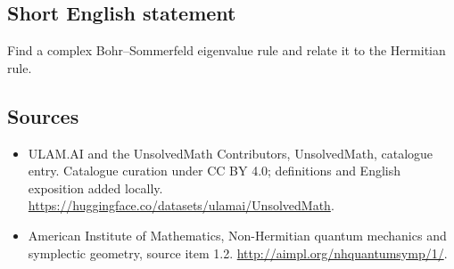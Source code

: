 \documentclass[11pt]{article}
\begin{document}
\subsection{Short English statement}
Find a complex Bohr--Sommerfeld eigenvalue rule and relate it to the Hermitian rule.
\subsection{Sources}
\begin{itemize}
\item[\hypertarget{source:statement:1}{S1}] ULAM.AI and the UnsolvedMath Contributors, UnsolvedMath, catalogue entry. Catalogue curation under CC BY 4.0; definitions and English exposition added locally.
\url{https://huggingface.co/datasets/ulamai/UnsolvedMath}.
\item[\hypertarget{source:statement:2}{S2}] American Institute of Mathematics, Non-Hermitian quantum mechanics and symplectic geometry, source item 1.2.
\url{http://aimpl.org/nhquantumsymp/1/}.
\end{itemize}
\label{end:statement}
\end{document}
